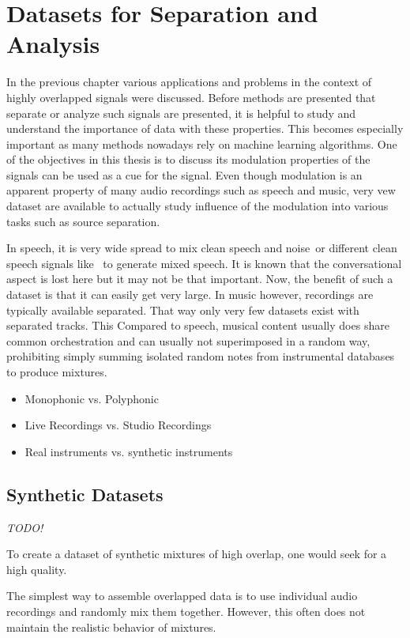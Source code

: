 \chapter{Datasets for Separation and Analysis}
\label{cha:datasets}
In the previous chapter various applications and problems in the context of highly overlapped signals were discussed.
Before methods are presented that separate or analyze such signals are presented, it is helpful to study and understand the importance of data with these properties.
This becomes especially important as many methods nowadays rely on machine learning algorithms.
One of the objectives in this thesis is to discuss its modulation properties of the signals can be used as a cue for the signal.
Even though modulation is an apparent property of many audio recordings such as speech and music, very vew dataset are available to actually study influence of the modulation into various tasks such as source separation.
\par
In speech, it is very wide spread to mix clean speech and noise~\cite{varga93}or different clean speech signals like~\cite{garofolo93} to generate mixed speech.
It is known that the conversational aspect is lost here but it may not be that important.
Now, the benefit of such a dataset is that it can easily get very large.
In music however, recordings are typically available separated.
That way only very few datasets exist with separated tracks. This
Compared to speech, musical content usually does share common orchestration and can usually not superimposed in a random way, prohibiting simply summing isolated random notes from instrumental databases to produce mixtures.

\begin{itemize}
  \item Monophonic vs. Polyphonic
  \item Live Recordings vs. Studio Recordings
  \item Real instruments vs. synthetic instruments
\end{itemize}

\section{Synthetic Datasets}

\emph{TODO!}

To create a dataset of synthetic mixtures of high overlap, one would seek for a high quality.

The simplest way to assemble overlapped data is to use individual audio recordings and randomly mix them together.
However, this often does not maintain the realistic behavior of mixtures.

